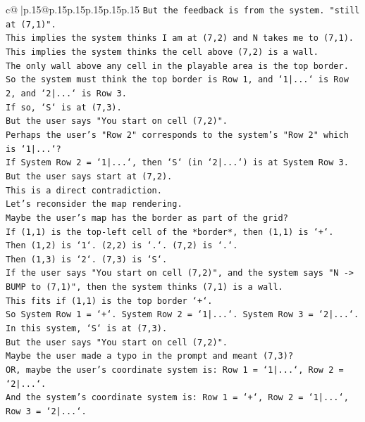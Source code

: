 \documentclass{article}
\begin{document}
{\begin{supertabular}{c@{$\;$}|p{.15\linewidth}@{}p{.15\linewidth}p{.15\linewidth}p{.15\linewidth}p{.15\linewidth}p{.15\linewidth}}
{{{\texttt{But the feedback is from the system. "still at (7,1)".} \\
\texttt{This implies the system thinks I am at (7,2) and N takes me to (7,1).} \\
\texttt{This implies the system thinks the cell above (7,2) is a wall.} \\
\texttt{The only wall above any cell in the playable area is the top border.} \\
\texttt{So the system must think the top border is Row 1, and `1|...` is Row 2, and `2|...` is Row 3.} \\
\texttt{If so, `S` is at (7,3).} \\
\texttt{But the user says "You start on cell (7,2)".} \\
\texttt{Perhaps the user's "Row 2" corresponds to the system's "Row 2" which is `1|...`?} \\
\texttt{If System Row 2 = `1|...`, then `S` (in `2|...`) is at System Row 3.} \\
\texttt{But the user says start at (7,2).} \\
\texttt{This is a direct contradiction.} \\
\texttt{Let's reconsider the map rendering.} \\
\texttt{Maybe the user's map has the border as part of the grid?} \\
\texttt{If (1,1) is the top{-}left cell of the *border*, then (1,1) is `+`.} \\
\texttt{Then (1,2) is `1`. (2,2) is `.`. (7,2) is `.`.} \\
\texttt{Then (1,3) is `2`. (7,3) is `S`.} \\
\texttt{If the user says "You start on cell (7,2)", and the system says "N {-}> BUMP to (7,1)", then the system thinks (7,1) is a wall.} \\
\texttt{This fits if (1,1) is the top border `+`.} \\
\texttt{So System Row 1 = `+`. System Row 2 = `1|...`. System Row 3 = `2|...`.} \\
\texttt{In this system, `S` is at (7,3).} \\
\texttt{But the user says "You start on cell (7,2)".} \\
\texttt{Maybe the user made a typo in the prompt and meant (7,3)?} \\
\texttt{OR, maybe the user's coordinate system is: Row 1 = `1|...`, Row 2 = `2|...`.} \\
\texttt{And the system's coordinate system is: Row 1 = `+`, Row 2 = `1|...`, Row 3 = `2|...`.} \\
}}}
\end{supertabular}}
\end{document}
